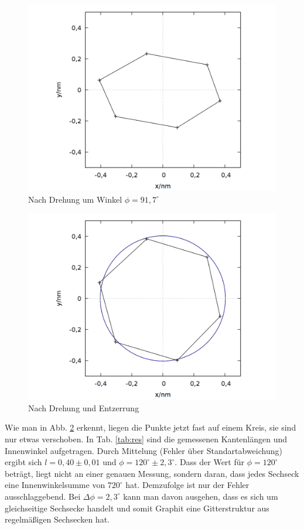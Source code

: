 \begin{figure}
\centering
\includegraphics[scale=0.3]{data/graphit/out_rotate_old.png}
\caption{Nach Drehung um Winkel $\phi = 91,7^\circ$}
\label{fig:fit1}
\end{figure}

\begin{figure}
\centering
\includegraphics[scale=0.3]{data/graphit/out_rotate.png}
\caption{Nach Drehung und Entzerrung}
\label{fig:fit2}
\end{figure}

Wie man in Abb. \ref{fig:fit2} erkennt, liegen die Punkte jetzt fast auf einem Kreis, sie sind nur etwas verschoben. In Tab. \ref{tab:res} sind die gemessenen Kantenlängen und Innenwinkel aufgetragen. Durch Mittelung (Fehler über Standartabweichung) ergibt sich $l = 0,40 \pm 0,01$ und $\phi = 120^\circ \pm 2,3^\circ$. Dass der Wert für $\phi = 120^\circ$ beträgt, liegt nicht an einer genauen Messung, sondern daran, dass jedes Sechseck eine Innenwinkelsumme von $720^\circ$ hat. Demzufolge ist nur der Fehler ausschlaggebend. Bei $\Delta\phi=2,3^\circ$ kann man davon ausgehen, dass es sich um gleichseitige Sechsecke handelt und somit Graphit eine Gitterstruktur aus regelmäßigen Sechsecken hat.\\

